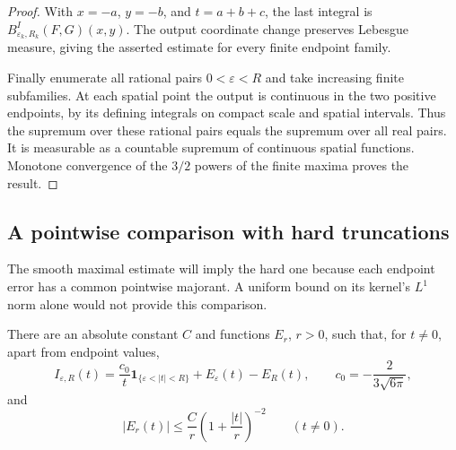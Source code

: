 \begin{proof}
With $x=-a$, $y=-b$, and $t=a+b+c$, the last integral is
$B^I_{\varepsilon_k,R_k}(F,G)(x,y)$. The output coordinate change
preserves Lebesgue measure, giving the asserted estimate for every
finite endpoint family.

Finally enumerate all rational pairs $0<\varepsilon<R$ and take
increasing finite subfamilies. At each spatial point the output is
continuous in the two positive endpoints, by its defining integrals
on compact scale and spatial intervals. Thus the supremum over these
rational pairs equals the supremum over all real pairs. It is measurable
as a countable supremum of continuous spatial functions. Monotone
convergence of the $3/2$ powers of the finite maxima proves the result.
\end{proof}

\subsection{A pointwise comparison with hard truncations}

The smooth maximal estimate will imply the hard one because each
endpoint error has a common pointwise majorant. A uniform bound on
its kernel's $L^1$ norm alone would not provide this comparison.

\begin{lemma}\label{lem:maximal-hard-kernel}
There are an absolute constant $C$ and functions $E_r$, $r>0$, such that,
for $t\ne0$, apart from endpoint values,
\begin{equation}\label{eq:maximal-hard-decomposition}
 I_{\varepsilon,R}(t)
  =\frac{c_0}{t}\mathbf1_{\{\varepsilon<|t|<R\}}
       +E_\varepsilon(t)-E_R(t),
 \qquad c_0=-\frac{2}{3\sqrt{6\pi}},
\end{equation}
and
\begin{equation}\label{eq:maximal-error-envelope}
 |E_r(t)|\le\frac{C}{r}\left(1+\frac{|t|}{r}\right)^{-2}
 \qquad(t\ne0).
\end{equation}
\end{lemma}

